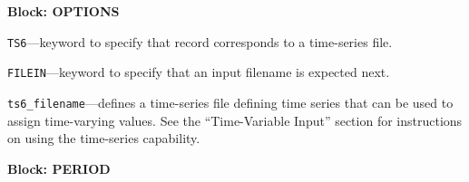 
\item \textbf{Block: OPTIONS}

\begin{description}
\item \texttt{TS6}---keyword to specify that record corresponds to a time-series file.

\item \texttt{FILEIN}---keyword to specify that an input filename is expected next.

\item \texttt{ts6\_filename}---defines a time-series file defining time series that can be used to assign time-varying values. See the ``Time-Variable Input'' section for instructions on using the time-series capability.

\end{description}
\item \textbf{Block: PERIOD}

